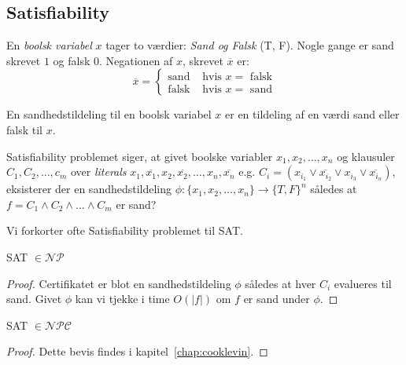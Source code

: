 \subsection{Satisfiability}%
\label{subsec:label}

\begin{definition}
	En \textit{boolsk variabel} $x$ tager to værdier: \textit{Sand og Falsk} (T, F). Nogle gange er sand skrevet $1$ og falsk $0$. Negationen af $x$, skrevet $\overline{x}$ er:
	\begin{equation*}
		\overline{x} = \begin{cases}
			\text{sand}  & \text{ hvis } x = \text{ falsk} \\
			\text{falsk} & \text{ hvis } x = \text{ sand}
		\end{cases}
	\end{equation*}
\end{definition}

\begin{definition}
	En sandhedstildeling til en boolsk variabel $x$ er en tildeling af en værdi sand eller falsk til $x$.
\end{definition}

Satisfiability problemet siger, at givet boolske variabler $x_{1}, x_{2}, \ldots, x_{n}$ og klausuler $C_{1}, C_{2}, \ldots, c_{m}$ over \textit{literals} $x_{1}, \overline{x_{1}}, x_{2}, \overline{x_{2}}, \ldots, x_{n}, \overline{x_{n}}$ e.g. $C_{i} = (x_{i_{1}} \lor \overline{x_{i_{2}}} \lor x_{i_{3}} \lor \overline{x_{i_{n}}})$, eksisterer der en sandhedstildeling $\phi : \{x_{1}, x_{2}, \ldots, x_{n}\} \rightarrow \{T, F\}^{n}$ således at $f = C_{1} \land C_{2} \wedge \ldots \wedge C_{m}$ er sand?

Vi forkorter ofte Satisfiability problemet til SAT.

\begin{theorem}
	SAT \(\in \mathcal{NP}\)
\end{theorem}


\begin{proof}
	Certifikatet er blot en sandhedstildeling \(\phi\) således at hver $C_{i}$ evalueres til sand. Givet \(\phi\) kan vi tjekke i time $O(|f|)$ om $f$ er sand under \(\phi\).
\end{proof}

\begin{theorem}
	\label{theo:satinnpc}
	SAT \(\in \mathcal{NPC}\)
\end{theorem}

\begin{proof}
	Dette bevis findes i kapitel~\ref{chap:cooklevin}.
\end{proof}

